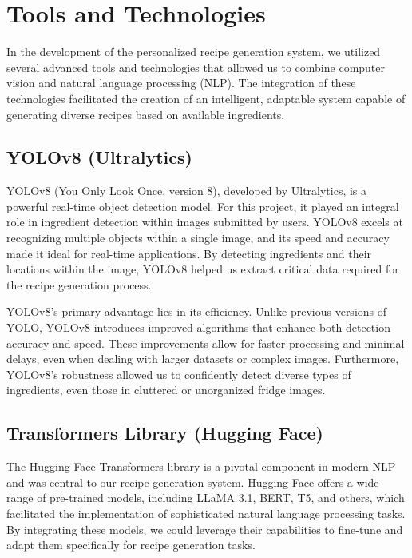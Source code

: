 \documentclass[letterpaper,11pt]{report}
\begin{document}
\section{Tools and Technologies}

In the development of the personalized recipe generation system, we utilized several advanced tools and technologies that allowed us to combine computer vision and natural language processing (NLP). The integration of these technologies facilitated the creation of an intelligent, adaptable system capable of generating diverse recipes based on available ingredients.

\subsection{YOLOv8 (Ultralytics)}

YOLOv8 (You Only Look Once, version 8), developed by Ultralytics, is a powerful real-time object detection model. For this project, it played an integral role in ingredient detection within images submitted by users. YOLOv8 excels at recognizing multiple objects within a single image, and its speed and accuracy made it ideal for real-time applications. By detecting ingredients and their locations within the image, YOLOv8 helped us extract critical data required for the recipe generation process.

YOLOv8's primary advantage lies in its efficiency. Unlike previous versions of YOLO, YOLOv8 introduces improved algorithms that enhance both detection accuracy and speed. These improvements allow for faster processing and minimal delays, even when dealing with larger datasets or complex images. Furthermore, YOLOv8’s robustness allowed us to confidently detect diverse types of ingredients, even those in cluttered or unorganized fridge images.

\subsection{Transformers Library (Hugging Face)}

The Hugging Face Transformers library is a pivotal component in modern NLP and was central to our recipe generation system. Hugging Face offers a wide range of pre-trained models, including LLaMA 3.1, BERT, T5, and others, which facilitated the implementation of sophisticated natural language processing tasks. By integrating these models, we could leverage their capabilities to fine-tune and adapt them specifically for recipe generation tasks.
\end{document}
